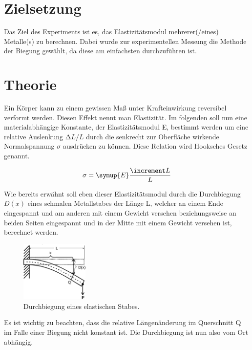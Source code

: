 \section{Zielsetzung}
\label{sec:Zielsetzung}

Das Ziel des Experiments ist es, das Elastizitätsmodul mehrerer(/eines) Metalle(s) zu berechnen.
Dabei wurde zur experimentellen Messung die Methode der Biegung gewählt, da diese am einfachsten durchzuführen ist.

\section{Theorie}
\label{sec:Theorie}

Ein Körper kann zu einem gewissen Maß unter Krafteinwirkung reversibel
verformt werden. Diesen Effekt nennt man Elastizität. Im folgenden soll nun
eine materialabhängige Konstante, der Elastizitätsmodul E, bestimmt werden
um eine relative Auslenkung $\increment L/L$ durch die senkrecht zur Oberfläche
wirkende Normalspannung $\sigma$ ausdrücken zu können. Diese Relation wird
Hooksches Gesetz genannt.

\begin{equation}
  \sigma = \symup{E}\frac{\increment L}{L}
  \label{eqn:hook}
\end{equation}

Wie bereits erwähnt soll eben dieser Elastizitätsmodul durch die
Durchbiegung $D(x)$ eines schmalen Metallstabes der Länge L, welcher an
einem Ende eingespannt und am anderen mit einem Gewicht versehen
beziehungsweise an beiden Seiten eingespannt und in der Mitte
mit einem Gewicht versehen ist, berechnet werden.
\begin{figure}
  \centering
  \includegraphics[width=0.3\textwidth]{content/images/Abbildung1.jpg}
  \caption{Durchbiegung eines elastischen Stabes.}
  \label{fig:abb1}
\end{figure}
Es ist wichtig zu beachten, dass die relative Längenänderung im Querschnitt
Q im Falle einer Biegung nicht konstant ist. Die Durchbiegung ist nun also
vom Ort abhängig.

